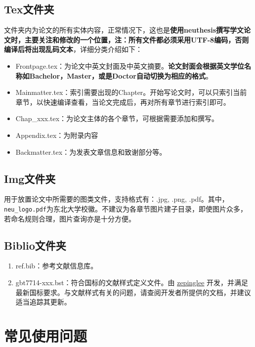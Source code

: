 \subsection{Tex文件夹}

文件夹内为论文的所有实体内容，正常情况下，这也是\textbf{使用neuthesis撰写学文论文时，主要关注和修改的一个位置，注：所有文件都必须采用UTF-8编码，否则编译后将出现乱码文本}，详细分类介绍如下：

\begin{itemize}
    \item Frontpage.tex：为论文中英文封面及中英文摘要。\textbf{论文封面会根据英文学位名称如Bachelor，Master，或是Doctor自动切换为相应的格式}。
    \item Mainmatter.tex：索引需要出现的Chapter。开始写论文时，可以只索引当前章节，以快速编译查看，当论文完成后，再对所有章节进行索引即可。
    \item Chap{\_}xxx.tex：为论文主体的各个章节，可根据需要添加和撰写。
    \item Appendix.tex：为附录内容
    \item Backmatter.tex：为发表文章信息和致谢部分等。
\end{itemize}

\subsection{Img文件夹}

用于放置论文中所需要的图类文件，支持格式有：.jpg, .png, .pdf。其中，\verb|neu_logo.pdf|为东北大学校徽。不建议为各章节图片建子目录，即使图片众多，若命名规则合理，图片查询亦是十分方便。

\subsection{Biblio文件夹}

\begin{enumerate}
    \item ref.bib：参考文献信息库。
    \item gbt7714-xxx.bst：符合国标的文献样式定义文件。由 \href{https://github.com/zepinglee/gbt7714-bibtex-style}{zepinglee}  开发，并满足最新国标要求。与文献样式有关的问题，请查阅开发者所提供的文档，并建议适当追踪其更新。
\end{enumerate}

\section{常见使用问题}\label{sec:qa}

